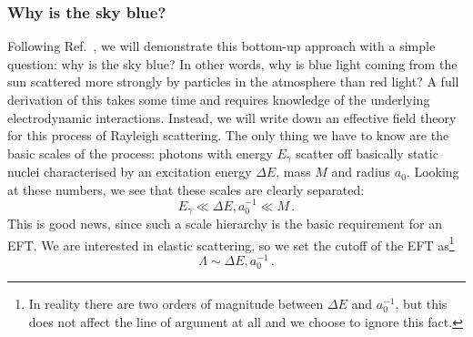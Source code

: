 




\subsubsection{Why is the sky blue?}

Following Ref.~\cite{Kaplan:2005es}, we will demonstrate this
bottom-up approach with a simple question: why is the sky blue?
In other words, why is blue light coming from the sun scattered more
strongly by particles in the atmosphere than red light?  A full
derivation of this takes some time and requires knowledge of the
underlying electrodynamic interactions. Instead, we will write down an
effective field theory for this process of Rayleigh scattering. The
only thing we have to know are the basic scales of the process:
photons with energy $E_\gamma$ scatter off basically static nuclei
characterised by an excitation energy $\Delta E$, mass $M$ and radius
$a_0$. Looking at these numbers, we see that these scales are clearly
separated:
%
\begin{equation}
  E_\gamma \ll \Delta E,  a_0^{-1} \ll M \,.
\end{equation}
%
This is good news, since such a scale hierarchy is the basic
requirement for an EFT. We are interested in elastic scattering, so we
set the cutoff of the EFT as\footnote{In reality there are two orders
  of magnitude between $\Delta E$ and $a_0^{-1}$, but this does not
  affect the line of argument at all and we choose to ignore this
  fact.}
\begin{equation}
  \Lambda \sim \Delta E, a_0^{-1} \,.
\end{equation}

